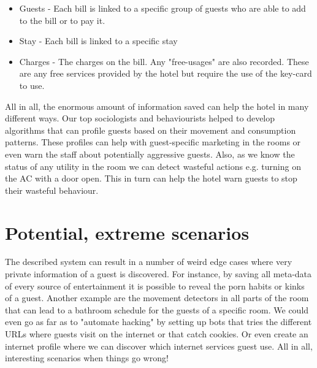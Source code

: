 \begin{itemize}
	\item Guests - Each bill is linked to a specific group of guests who are able to add to the bill or to pay it.
	\item Stay - Each bill is linked to a specific stay
	\item Charges - The charges on the bill. Any "free-usages" are also recorded. These are any free services provided by the hotel but require the use of the key-card to use.
\end{itemize}

All in all, the enormous amount of information saved can help the hotel in many different ways. Our top sociologists and behaviourists helped to develop algorithms that can profile guests based on their movement and consumption patterns. These profiles can help with guest-specific marketing in the rooms or even warn the staff about potentially aggressive guests. Also, as we know the status of any utility in the room we can detect wasteful actions e.g. turning on the AC with a door open. This in turn can help the hotel warn guests to stop their wasteful behaviour.

\section{Potential, extreme scenarios}
\label{sec:extreme_scen}
The described system can result in a number of weird edge cases where very private information of a guest is discovered. For instance, by saving all meta-data of every source of entertainment it is possible to reveal the porn habits or kinks of a guest. Another example are the movement detectors in all parts of the room that can lead to a bathroom schedule for the guests of a specific room. We could even go as far as to "automate hacking" by setting up bots that tries the different URLs where guests visit on the internet or that catch cookies. Or even create an internet profile where we can discover which internet services guest use. All in all, interesting scenarios when things go wrong!

